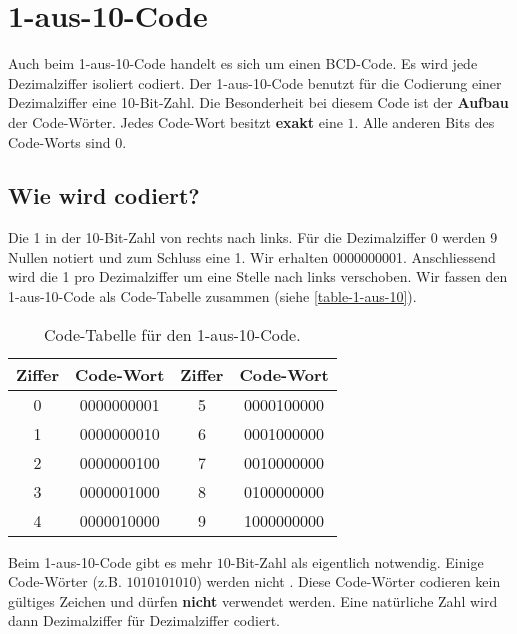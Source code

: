 \section{1-aus-10-Code}

Auch beim 1-aus-10-Code handelt es sich um einen \ac{BCD}-Code. Es wird jede Dezimalziffer isoliert codiert. Der 1-aus-10-Code benutzt für die Codierung einer Dezimalziffer eine 10-Bit-Zahl. Die Besonderheit bei diesem Code ist der \textbf{Aufbau} der Code-Wörter. Jedes Code-Wort besitzt \textbf{exakt} eine $1$. Alle anderen Bits des Code-Worts sind $0$. 

\subsection{Wie wird codiert?}

Die \num{1} in der \num{10}-Bit-Zahl  von rechts nach links. Für die Dezimalziffer \num{0} werden \num{9} Nullen notiert und zum Schluss eine \num{1}. Wir erhalten 0000000001. Anschliessend wird die \num{1} pro Dezimalziffer um eine Stelle nach links verschoben. Wir fassen den 1-aus-10-Code als Code-Tabelle zusammen (siehe \autoref{table-1-aus-10}).

\begin{table}[htb]
\centering
\begin{tabular}{|c|c|c|c|}
\hline
Ziffer & Code-Wort & Ziffer & Code-Wort \\ \hline
0       &   0000000001        & 5       &   0000100000        \\ \hline
1       &   0000000010        & 6       &   0001000000        \\ \hline
2       &   0000000100        & 7       &   0010000000        \\ \hline
3       &   0000001000        & 8       &   0100000000        \\ \hline
4       &   0000010000        & 9       &   1000000000        \\ \hline
\end{tabular}
\caption{Code-Tabelle für den 1-aus-10-Code.}
\label{table-1-aus-10}
\end{table}

Beim 1-aus-10-Code gibt es mehr $10$-Bit-Zahl als eigentlich notwendig. Einige Code-Wörter (z.B. $1010101010$) werden nicht . Diese Code-Wörter codieren kein gültiges Zeichen und dürfen \textbf{nicht} verwendet werden. Eine natürliche Zahl wird dann Dezimalziffer für Dezimalziffer codiert. 


